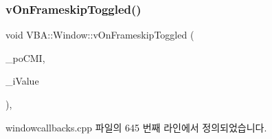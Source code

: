 \subsubsection{\texorpdfstring{v\+On\+Frameskip\+Toggled()}{vOnFrameskipToggled()}}
{\footnotesize\ttfamily void V\+B\+A\+::\+Window\+::v\+On\+Frameskip\+Toggled (\begin{DoxyParamCaption}\item[{Gtk\+::\+Check\+Menu\+Item $\ast$}]{\+\_\+po\+C\+MI,  }\item[{\mbox{\hyperlink{_util_8cpp_a0ef32aa8672df19503a49fab2d0c8071}{int}}}]{\+\_\+i\+Value }\end{DoxyParamCaption})\hspace{0.3cm}{\ttfamily [protected]}, {\ttfamily [virtual]}}



windowcallbacks.\+cpp 파일의 645 번째 라인에서 정의되었습니다.


